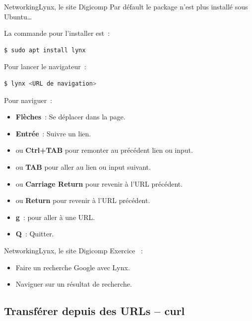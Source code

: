 \documentclass{beamer}
\begin{document}
    \begin{frame}[fragile]{Networking}{Lynx, le site Digicomp}
        Par défault le package n'est plus installé sous Ubuntu\ldots

        La commande pour l'installer est~:
        \begin{lstlisting}[language=bash]
$ sudo apt install lynx
        \end{lstlisting}
        Pour lancer le navigateur~:
        \begin{lstlisting}[language=bash]
$ lynx <URL de navigation>
        \end{lstlisting}
        Pour naviguer~:
        \begin{itemize}
            \item \textbf{Flèches}~: Se déplacer dans la page.
            \item \textbf{Entrée}~: Suivre un lien.
            \item {} ou \textbf{Ctrl+TAB} pour remonter au précédent lien ou input.
            \item {} ou \textbf{TAB} pour aller au lien ou input suivant.
            \item {} ou \textbf{Carriage Return} pour revenir à l'URL précédent.
            \item {} ou \textbf{Return} pour revenir à l'URL précédent.
            \item \textbf{g}~: pour aller à une URL.
            \item \textbf{Q}~: Quitter.
        \end{itemize}
    \end{frame}

    \begin{frame}{Networking}{Lynx, le site Digicomp}
        Exercice \execcounterdispinc~:
        \begin{itemize}
            \item Faire un recherche Google avec Lynx.
            \item Naviguer sur un résultat de recherche.
        \end{itemize}
    \end{frame}

    \subsection{Transférer depuis des URLs – curl}\label{subsec:curl}
\end{document}

